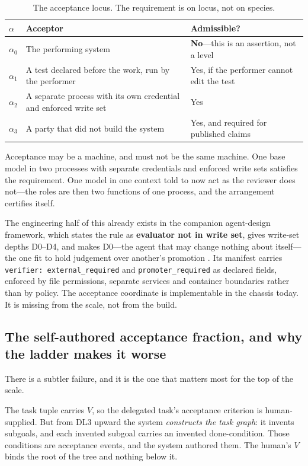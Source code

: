 \documentclass[11pt]{article}
\theoremstyle{definition}
\begin{document}
\begin{table}[h]
\centering\small
\begin{tabularx}{\textwidth}{@{}llY@{}}
\toprule
$\alpha$ & Acceptor & Admissible? \\
\midrule
$\alpha_0$ & The performing system & \textbf{No}---this is an assertion, not a level \\
$\alpha_1$ & A test declared before the work, run by the performer & Yes, if the performer cannot edit the test \\
$\alpha_2$ & A separate process with its own credential and enforced write set & Yes \\
$\alpha_3$ & A party that did not build the system & Yes, and required for published claims \\
\bottomrule
\end{tabularx}
\caption{The acceptance locus. The requirement is on locus, not on species.}
\end{table}

Acceptance may be a machine, and must not be the same machine. One base model in two processes with separate credentials and enforced write sets satisfies the requirement. One model in one context told to now act as the reviewer does not---the roles are then two functions of one process, and the arrangement certifies itself.

The engineering half of this already exists in the companion agent-design framework, which states the rule as \textbf{evaluator not in write set}, gives write-set depths D0--D4, and makes D0---the agent that may change nothing about itself---the one fit to hold judgement over another's promotion \citep{yang2026agentdesign}. Its manifest carries \texttt{verifier: external\_required} and \texttt{promoter\_required} as declared fields, enforced by file permissions, separate services and container boundaries rather than by policy. The acceptance coordinate is implementable in the chassis today. It is missing from the scale, not from the build.

\subsection{The self-authored acceptance fraction, and why the ladder makes it worse}

There is a subtler failure, and it is the one that matters most for the top of the scale.

The task tuple carries $V$, so the delegated task's acceptance criterion is human-supplied. But from DL3 upward the system \emph{constructs the task graph}: it invents subgoals, and each invented subgoal carries an invented done-condition. Those conditions are acceptance events, and the system authored them. The human's $V$ binds the root of the tree and nothing below it.
\end{document}
